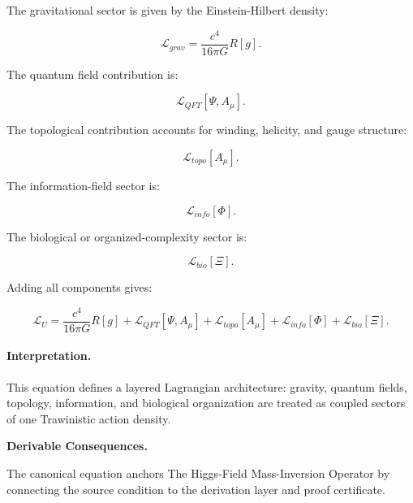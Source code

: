 The gravitational sector is given by the Einstein-Hilbert density:

\begin{equation}
\mathcal{L}_{grav}
=
\frac{c^4}{16\pi G}R[g].
\end{equation}

The quantum field contribution is:

\begin{equation}
\mathcal{L}_{QFT}[\Psi,A_\mu].
\end{equation}

The topological contribution accounts for winding, helicity, and gauge structure:

\begin{equation}
\mathcal{L}_{topo}[A_\mu].
\end{equation}

The information-field sector is:

\begin{equation}
\mathcal{L}_{info}[\Phi].
\end{equation}

The biological or organized-complexity sector is:

\begin{equation}
\mathcal{L}_{bio}[\Xi].
\end{equation}

Adding all components gives:

\begin{equation}
\boxed{
\mathcal{L}_U
=
\frac{c^4}{16\pi G}R[g]
+
\mathcal{L}_{QFT}[\Psi,A_\mu]
+
\mathcal{L}_{topo}[A_\mu]
+
\mathcal{L}_{info}[\Phi]
+
\mathcal{L}_{bio}[\Xi].
}
\end{equation}

\paragraph{Interpretation.}
This equation defines a layered Lagrangian architecture: gravity, quantum fields, topology, information, and biological organization are treated as coupled sectors of one Trawinistic action density.

\par\vspace{0.35em}
\noindent\textbf{Derivable Consequences.}\quad
\begingroup
\footnotesize
\raggedright
The canonical equation anchors The Higgs-Field Mass-Inversion Operator by connecting the source condition to the derivation layer and proof certificate.
\par\endgroup

